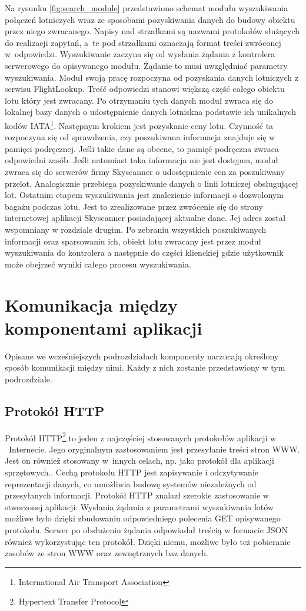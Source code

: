 \documentclass[12pt, twoside]{report}
\begin{document}
Na rysunku \ref{fig:search_module} przedstawiono schemat modułu wyszukiwania połączeń lotniczych wraz ze sposobami pozyskiwania danych do budowy obiektu przez niego zwracanego.
Napisy nad strzałkami są nazwami protokołów służących do realizacji zapytań, a~te pod strzałkami oznaczają format treści zwróconej w~odpowiedzi. Wyszukiwanie zaczyna się od wysłania żądania z kontrolera serwerowego do opisywanego modułu. Żądanie to musi uwzględniać  parametry wyszukiwania. Moduł swoją pracę rozpoczyna od pozyskania danych lotniczych z serwisu FlightLookup. Treść odpowiedzi stanowi większą część całego obiektu lotu który jest zwracany. Po otrzymaniu tych danych moduł zwraca się do lokalnej bazy danych o udostępnienie danych lotniskna podstawie ich unikalnych kodów IATA\footnote{International Air Transport Association}. Następnym krokiem jest pozyskanie ceny lotu. Czynność ta rozpoczyna się od sprawdzenia, czy poszukiwana informacja znajduje się w pamięci podręcznej. Jeśli takie dane są obecne, to pamięć podręczna zwraca odpowiedni zasób. Jeśli natomiast taka informacja nie jest dostępna, moduł zwraca się do serwerów firmy Skyscanner o udostępnienie cen za poszukiwany przelot. Analogicznie przebiega pozyskiwanie danych o linii lotniczej obsługującej lot. Ostatnim etapem wyszukiwania jest znalezienie informacji o dozwolonym bagażu podczas lotu. Jest to zrealizowane przez zwrócenie się do strony internetowej aplikacji Skyscanner posiadającej aktualne dane. Jej adres został wspomniany w rozdziale drugim. Po zebraniu wszystkich poszukiwanych informacji oraz sparsowaniu ich, obiekt lotu zwracany jest przez moduł wyszukiwania do kontrolera a następnie do części klienckiej gdzie użytkownik może obejrzeć wyniki całego procesu wyszukiwania.

\section{Komunikacja między komponentami aplikacji}
Opisane we wcześniejszych podrozdziałach komponenty narzucają określony sposób komunikacji między nimi. Każdy z nich zostanie przedstawiony w tym podrozdziale.

\subsection{Protokół HTTP}
Protokół HTTP\footnote{Hypertext Transfer Protocol} to jeden z najczęściej stosowanych  protokołów aplikacji w ~Internecie. Jego oryginalnym zastosowaniem jest przesyłanie treści stron WWW. Jest on również stosowany w~innych celach, np. jako protokół dla aplikacji sprzętowych.\cite{http}. Cechą protokołu HTTP jest zapisywanie i odczytywanie reprezentacji danych, co umożliwia budowę systemów niezależnych od przesyłanych informacji. Protokół HTTP znalazł szerokie zastosowanie w stworzonej aplikacji. Wysłania żądania z parametrami wyszukiwania lotów możliwe było dzięki zbudowaniu odpowiedniego polecenia GET opisywanego protokołu. Serwer po obsłużeniu żądania odpowiadał treścią w formacie JSON również wykorzystując ten protokół. Dzięki niemu, możliwe było też pobieranie zasobów ze stron WWW oraz zewnętrznych baz danych.
 
\end{document}
